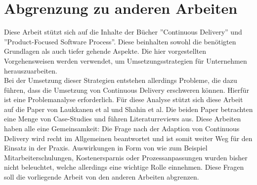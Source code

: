 \section{Abgrenzung zu anderen Arbeiten}
Diese Arbeit stützt sich auf die Inhalte der Bücher ''Continuous Delivery''\cite{Wolff.2016} und ''Product-Focused Software Process''\cite{Jedlitschka.2014}. Diese beinhalten sowohl die benötigten Grundlagen als auch tiefer gehende Aspekte. Die hier vorgestellten Vorgehensweisen werden verwendet, um Umsetzungsstrategien für Unternehmen herauszuarbeiten. \\ Bei der Umsetzung dieser Strategien entstehen allerdings Probleme, die dazu führen, dass die Umsetzung von Continuous Delivery erschweren können. Hierfür ist eine Problemanalyse erforderlich. Für diese Analyse stützt sich diese Arbeit auf die Paper von Laukkanen et al\cite{Laukkanen.2017} und Shahin et al\cite{Shahin.2017}. Die beiden Paper betrachten eine Menge von Case-Studies und führen Literaturreviews aus. Diese Arbeiten haben alle eine Gemeinsamkeit: Die Frage nach der Adaption von Continuous Delivery wird recht im Allgemeinen beantwortet und ist somit weiter Weg für den Einsatz in der Praxis. Auswirkungen in Form von wie zum Beispiel Mitarbeiterschulungen, Kostenersparnis oder Prozessanpassungen wurden bisher nicht beleuchtet, welche allerdings eine wichtige Rolle einnehmen. Diese Fragen soll die vorliegende Arbeit von den anderen Arbeiten abgrenzen.  